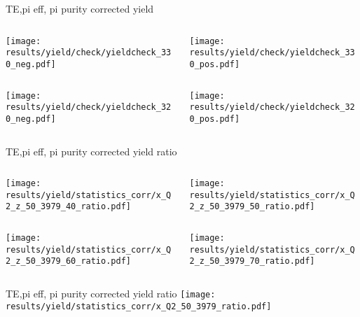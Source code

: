 \begin{frame}{TE,pi eff, pi purity corrected yield}
\begin{columns}
\begin{column}[T]{0.5\textwidth}
\texttt{[image: results/yield/check/yieldcheck\_330\_neg.pdf]}
\end{column}
\begin{column}[T]{0.5\textwidth}
\texttt{[image: results/yield/check/yieldcheck\_330\_pos.pdf]}
\end{column}
\end{columns}
\begin{columns}
\begin{column}[T]{0.5\textwidth}
\texttt{[image: results/yield/check/yieldcheck\_320\_neg.pdf]}
\end{column}
\begin{column}[T]{0.5\textwidth}
\texttt{[image: results/yield/check/yieldcheck\_320\_pos.pdf]}
\end{column}
\end{columns}
\end{frame}
\begin{frame}{TE,pi eff, pi purity corrected yield ratio}
\begin{columns}
\begin{column}[T]{0.5\textwidth}
\texttt{[image: results/yield/statistics\_corr/x\_Q2\_z\_50\_3979\_40\_ratio.pdf]}
\end{column}
\begin{column}[T]{0.5\textwidth}
\texttt{[image: results/yield/statistics\_corr/x\_Q2\_z\_50\_3979\_50\_ratio.pdf]}
\end{column}
\end{columns}
\begin{columns}
\begin{column}[T]{0.5\textwidth}
\texttt{[image: results/yield/statistics\_corr/x\_Q2\_z\_50\_3979\_60\_ratio.pdf]}
\end{column}
\begin{column}[T]{0.5\textwidth}
\texttt{[image: results/yield/statistics\_corr/x\_Q2\_z\_50\_3979\_70\_ratio.pdf]}
\end{column}
\end{columns}
\end{frame}
\begin{frame}{TE,pi eff, pi purity corrected yield ratio}
\texttt{[image: results/yield/statistics\_corr/x\_Q2\_50\_3979\_ratio.pdf]}
\end{frame}
